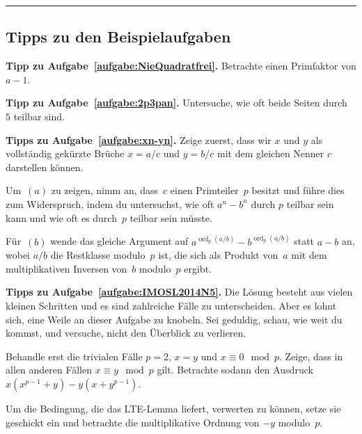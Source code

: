 \newpage\phantom{newpage}\vfill\hrule\vspace{-1em}

\subsection*{Tipps zu den Beispielaufgaben}


\textbf{Tipp zu Aufgabe~\ref{aufgabe:NieQuadratfrei}.} Betrachte einen Primfaktor von $a-1$.

\textbf{Tipp zu Aufgabe~\ref{aufgabe:2p3pan}.} Untersuche, wie oft beide Seiten durch~$5$ teilbar sind.


\textbf{Tipps zu Aufgabe~\ref{aufgabe:xn-yn}.} Zeige zuerst, dass wir $x$ und $y$ als vollständig gekürzte Brüche $x=a/c$ und $y=b/c$ mit dem gleichen Nenner $c$ darstellen können.

Um~$(a)$ zu zeigen, nimm an, dass~$c$ einen Primteiler~$p$ besitzt und führe dies zum Widerspruch, indem du untersuchst, wie oft $a^n-b^n$ durch $p$ teilbar sein kann und wie oft es durch~$p$ teilbar sein müsste.

Für~$(b)$ wende das gleiche Argument auf $a^{\operatorname{ord}_p(a/b)}-b^{\operatorname{ord}_p(a/b)}$ statt $a-b$ an, wobei $a/b$ die Restklasse modulo~$p$ ist, die sich als Produkt von~$a$ mit dem multiplikativen Inversen von~$b$ modulo~$p$ ergibt.

\textbf{Tipps zu Aufgabe~\ref{aufgabe:IMOSL2014N5}.} Die Lösung besteht aus vielen kleinen Schritten und es sind zahlreiche Fälle zu unterscheiden. Aber es lohnt sich, eine Weile an dieser Aufgabe zu knobeln. Sei geduldig, schau, wie weit du kommst, und versuche, nicht den Überblick zu verlieren.

Behandle erst die trivialen Fälle $p=2$, $x=y$ und $x\equiv 0\mod p$. Zeige, dass in allen anderen Fällen $x\equiv y\mod p$ gilt. Betrachte sodann den Ausdruck $x(x^{p-1}+y)-y(x+y^{p-1})$.

Um die Bedingung, die das LTE-Lemma liefert, verwerten zu können, setze sie geschickt ein und betrachte die multiplikative Ordnung von $-y$ modulo~$p$.